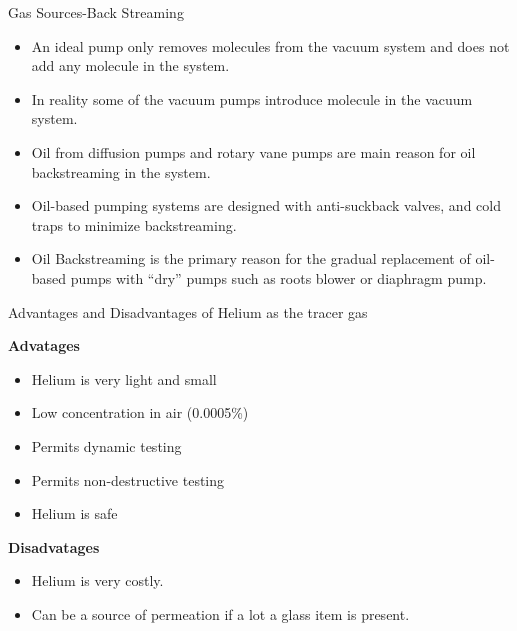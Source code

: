 \documentclass[11pt]{beamer}
\begin{document}
\begin{frame}{Gas Sources-Back Streaming}
\begin{itemize}
\item An ideal pump only removes molecules from the vacuum system and does not add any molecule in the system.
\item In reality some of the vacuum pumps introduce molecule in the vacuum system.
\item Oil from diffusion pumps and rotary vane pumps are main reason for oil backstreaming in the system.
\item Oil-based pumping systems are designed with anti-suckback valves, and cold traps to minimize backstreaming.
\item Oil Backstreaming  is the primary reason for the gradual replacement of oil-based pumps with “dry” pumps such as roots blower or diaphragm pump.
\end{itemize}


\end{frame}



\begin{frame}{Advantages and Disadvantages of Helium as the tracer gas}

\textbf{Advatages}
\begin{itemize}
\item Helium is very light and small
\item Low concentration in air (0.0005\%)
\item Permits dynamic testing
\item Permits non-destructive testing
\item Helium is safe

\end{itemize}

\textbf{Disadvatages}
\begin{itemize}
\item Helium is very costly.
\item Can be a source of permeation if a lot a glass item is present.

\end{itemize}
\end{frame}
\end{document}
